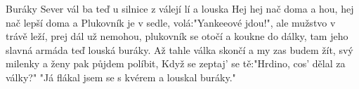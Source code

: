 \begin{TEXT}{Buráky}
\SLOKA {} Sever vál \NL
{} ba teď \NL
{} u silnice  z \NL
{} válejí lí a louska
\REFREN Hej  hej  nač \NL
{} doma  a \NL
{} hou, hej  nač \NL
{} lepší doma  a 
\SLOKA Plukovník je v sedle, volá:"Yankeeové jdou!",\NL
ale mužstvo v trávě leží, prej dál už nemohou,\NL
plukovník se otočí a koukne do dálky,\NL
tam jeho slavná armáda teď louská buráky.
\REFRENHRAJ
\SLOKA Až tahle válka skončí a my zas budem žít,\NL
svý milenky a ženy pak půjdem políbit,\NL
Když se zeptaj' se tě:"Hrdino, cos' dělal za války?"\NL
"Já flákal jsem se s kvérem a louskal buráky."
\REFRENHRAJ
\end{TEXT}
